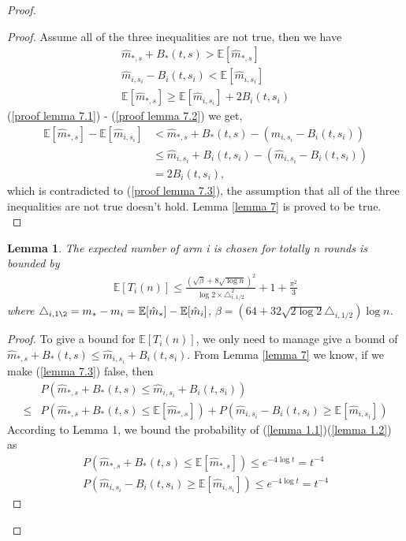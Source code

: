 \documentclass{article}
\theoremstyle{plain}
\newtheorem{lemma}{Lemma}
\begin{document}
\begin{proof}
\begin{proof}
Assume all of the three inequalities are not true, then we have
    \begin{align}
        \label{proof lemma 7.1}
         \hat{m}_{*, s} + B_*(t, s) >  \mathbb{E}[\hat{m}_{*, s}]\\
        \label{proof lemma 7.2}
        \hat{m}_{i, s_i} - B_i(t, s_i) < \mathbb{E}[\hat{m}_{i, s_i}]\\
        \label{proof lemma 7.3}
        \mathbb{E}[\hat{m}_{*, s}] \geq \mathbb{E}[\hat{m}_{i, s_i}] + 2 B_i(t, s_i)
    \end{align}
    (\ref{proof lemma 7.1}) - (\ref{proof lemma 7.2}) we get, 
    \begin{align}
         \mathbb{E}[\hat{m}_{*, s}] - \mathbb{E}[\hat{m}_{i, s_i}] &< 
         \hat{m}_{*, s} + B_*(t, s) - (\hat{m}_{i, s_i} - B_i(t, s_i)) \\
        & \leq \hat{m}_{i, s_i} + B_i(t, s_i) - (\hat{m}_{i, s_i} - B_i(t, s_i)) \\
        &= 2 B_i(t, s_i),
    \end{align}
    which is contradicted to (\ref{proof lemma 7.3}), the assumption that all of the three inequalities are not true doesn't hold. Lemma \ref{lemma 7} is proved to be true.\\
\end{proof}

\begin{lemma}
\label{Lemma 8: bound for E[T_i(n)]}
    The expected number of arm i is chosen for totally n rounds is bounded by 
    \begin{align}
        \mathbb{E}[T_i(n)] \leq  \frac{(\sqrt{\beta} + 8 \sqrt{\log n})^2}{\log 2 \times \triangle_{i, 1/2}^2} + 1 + \frac{\pi^2}{3}
    \end{align}
    where $\triangle_{i, 1\2} = m_\ast - m_i = \mathbb{E}[\hat{m}_\ast] - \mathbb{E}[\hat{m}_i]$, $\beta = (64 + 32 \sqrt{2 \log 2} \triangle_{i,1/2} )\log n$.
\end{lemma}

\begin{proof}
To give a bound for $\mathbb{E}[T_i(n)]$, we only need to manage give a bound of $\hat{m}_{*, s} + B_*(t, s)  \leq \hat{m}_{i, s_i} + B_i(t, s_i)$. From Lemma \ref{lemma 7} we know, if we make (\ref{lemma 7.3}) false, then 
\begin{align}
    & P(\hat{m}_{*, s} + B_*(t, s)  \leq \hat{m}_{i, s_i} + B_i(t, s_i)) \\
    \leq &  P(\hat{m}_{*, s} + B_*(t, s) \leq  \mathbb{E}[\hat{m}_{*, s}]) + P(\hat{m}_{i, s_i} - B_i(t, s_i) \geq \mathbb{E}[\hat{m}_{i, s_i}])
\end{align}
According to Lemma 1, we bound the probability of (\ref{lemma 1.1})(\ref{lemma 1.2}) as
    \begin{align}
        P(\hat{m}_{*, s} + B_*(t, s) \leq  \mathbb{E}[\hat{m}_{*, s}]) \leq  e^{-4\log t} = t^{-4}\\
        P(\hat{m}_{i, s_i} - B_i(t, s_i) \geq \mathbb{E}[\hat{m}_{i, s_i}])  \leq  e^{-4\log t} = t^{-4}
    \end{align}
    

\end{proof}
\end{proof}
\end{document}
